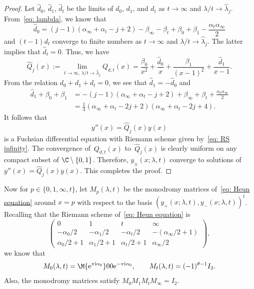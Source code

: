 \begin{proof} Let $\hat d_0$, $\hat d_1$, $\hat d_t$ be the limits of $d_0$,
 $d_1$, and $d_t$ as $t\to\infty$ and $\lambda/t\to\hat\lambda_j$.
 From~\eqref{eq: lambda}, we know that
\[
 \hat d_0=(j-1)(\alpha_\infty+\alpha_t-j+2)
 -\beta_\infty-\beta_t+\beta_0+\beta_1-\frac{\alpha_t\alpha_\infty}2
\]
 and $(t-1)d_t$ converge to finite numbers as $t\to\infty$ and
 $\lambda/t\to\hat\lambda_j$. The latter implies that
 $\hat d_t=0$. Thus, we have
\[
 \hat Q_j(x):=\lim_{t\to\infty,\,\lambda/t\to\hat\lambda_j}Q_{d,t}(x)
 =\frac{\beta_0}{x^2}+\frac{\hat d_0}x
 +\frac{\beta_1}{(x-1)^2}+\frac{\hat d_1}{x-1}.
\]
 From the relation $d_0+d_1+d_t=0$, we see that $\hat d_1=-\hat d_0$
 and
 \begin{equation*}
 \begin{split}
 \hat d_1+\beta_0+\beta_1
 &{}=-(j-1)(\alpha_\infty+\alpha_t-j+2)+\beta_\infty+\beta_t
 +\frac{\alpha_t\alpha_\infty}2 \\
 &{}=\frac14(\alpha_\infty+\alpha_t-2j+2)
 (\alpha_\infty+\alpha_t-2j+4).
 \end{split}
 \end{equation*}
 It follows that
\[
 y''(x)=\hat Q_j(x)y(x)
\]
 is a Fuchsian differential equation with Riemann scheme
 given by~\eqref{eq: RS infinity}. The convergence of~$Q_{d,t}(x)$ to~$\hat Q_j(x)$ is clearly uniform on any compact subset of ${\C\setminus\{0,1\}}$.
 Therefore, $y_\pm(x;\lambda,t)$ converge to solutions of
 $y''(x)=\hat Q_j(x)y(x)$. This completes the proof.
\end{proof}

Now for $p\in\{0,1,\infty,t\}$, let $M_p(\lambda,t)$ be the monodromy
matrices of~\eqref{eq: Heun equation} around $x=p$ with respect to the
basis $(y_+(x;\lambda,t),y_-(x;\lambda,t))^t$.
Recalling that the Riemann scheme of~\eqref{eq: Heun equation} is
\[
\begin{pmatrix}
 0 & 1 & t & \infty \\
 -\alpha_0/2 & -\alpha_1/2 & -\alpha_t/2 & -(\alpha_\infty/2+1) \\
 \alpha_0/2+1 & \alpha_1/2+1 & \alpha_t/2+1 & \alpha_\infty/2
\end{pmatrix},
\]
we know that
\[
M_0(\lambda,t)=\M{{\rm e}^{\pi {\rm i}\alpha_0}}00{{\rm e}^{-\pi {\rm i}\alpha_0}}, \qquad
M_t(\lambda,t)=(-1)^{\theta-1}I_2.
\]
Also, the monodromy matrices satisfy $M_0M_1M_tM_\infty=I_2$.

